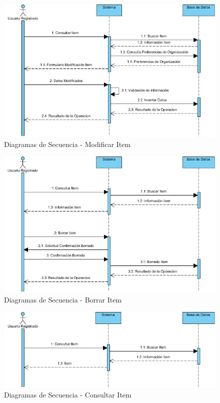 \documentclass[a4paper,11pt]{book}
\begin{document}
\begin{figure}[H] 
\centering 
\includegraphics[scale=0.50]{imagenes/secuencia/Modificar_Item.jpg}
\caption{ Diagramas de Secuencia - Modificar Item\cite{diagrama}  }  
\end{figure}

\begin{figure}[H] 
\centering 
\includegraphics[scale=0.50]{imagenes/secuencia/Borrar_Item.jpg}
\caption{ Diagramas de Secuencia - Borrar Item\cite{diagrama}  }  
\end{figure}

\begin{figure}[H] 
\centering 
\includegraphics[scale=0.50]{imagenes/secuencia/Consultar_Item.jpg}
\caption{ Diagramas de Secuencia - Consultar Item\cite{diagrama}  }  
\end{figure}
\end{document}
